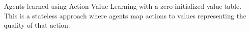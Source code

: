 \documentclass{aamas2014}
\begin{document}
Agents learned using Action-Value Learning with a zero initialized value table. This is a stateless approach where agents map actions to values representing the quality of that action. 





 
\end{document}
